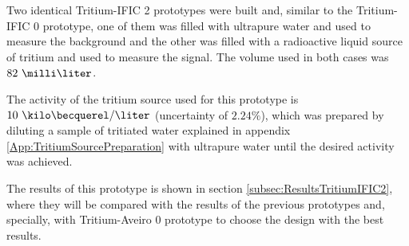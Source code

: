 Two identical Tritium-IFIC 2 prototypes were built and, similar to the Tritium-IFIC 0 prototype, one of them was filled with ultrapure water and used to measure the background and the other was filled with a radioactive liquid source of tritium and used to measure the signal. The volume used in both cases was $82~\milli\liter$.

The activity of the tritium source used for this prototype is $10~\kilo\becquerel/\liter$ (uncertainty of $2.24\%$), which was prepared by diluting a sample of tritiated water explained in appendix \ref{App:TritiumSourcePreparation} with ultrapure water until the desired activity was achieved.

The results of this prototype is shown in section \ref{subsec:ResultsTritiumIFIC2}, where they will be compared with the results of the previous prototypes and, specially, with Tritium-Aveiro 0 prototype to choose the design with the best results.